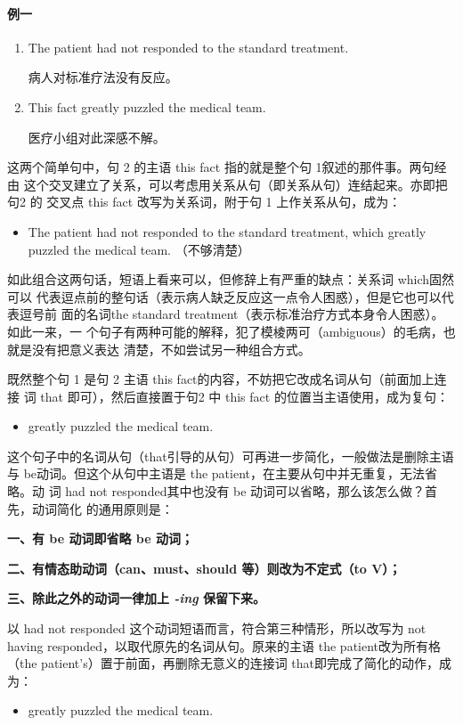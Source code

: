 \paragraph{例一}

\begin{enumerate}
\item The patient had not responded to the standard treatment.

  病人对标准疗法没有反应。
\item This fact greatly puzzled the medical team.

  医疗小组对此深感不解。
\end{enumerate}

这两个简单句中，句 2 的主语 this fact 指的就是整个句 1叙述的那件事。两句经由
这个交叉建立了关系，可以考虑用关系从句（即关系从句）连结起来。亦即把句2 的
交叉点 this fact 改写为关系词，附于句 1 上作关系从句，成为：
\begin{itemize}
\item The patient had not responded to the standard treatment, which greatly
  puzzled the medical team. （不够清楚）
\end{itemize}

如此组合这两句话，短语上看来可以，但修辞上有严重的缺点：关系词 which固然可以
代表逗点前的整句话（表示病人缺乏反应这一点令人困惑），但是它也可以代表逗号前
面的名词the standard treatment（表示标准治疗方式本身令人困惑）。如此一来，一
个句子有两种可能的解释，犯了模棱两可（ambiguous）的毛病，也就是没有把意义表达
清楚，不如尝试另一种组合方式。

既然整个句 1 是句 2 主语 this fact的内容，不妨把它改成名词从句（前面加上连接
词 that 即可），然后直接置于句2 中 this fact 的位置当主语使用，成为复句：
\begin{itemize}
\item {} greatly
  puzzled the medical team.
\end{itemize}
这个句子中的名词从句（that引导的从句）可再进一步简化，一般做法是删除主语
与 be动词。但这个从句中主语是 the patient，在主要从句中并无重复，无法省略。动
词 had not responded其中也没有 be 动词可以省略，那么该怎么做？首先，动词简化
的通用原则是：

\textbf{一、有 be 动词即省略 be 动词；}

\textbf{二、有情态助动词（can、must、should 等）则改为不定式（to V）；}

\textbf{三、除此之外的动词一律加上 \emph{-ing} 保留下来。}

以 had not responded 这个动词短语而言，符合第三种情形，所以改写为 not having
responded，以取代原先的名词从句。原来的主语 the patient改为所有格（the
patient's）置于前面，再删除无意义的连接词 that即完成了简化的动作，成为：
\begin{itemize}
\item {}
  greatly puzzled the medical team.
\end{itemize}

